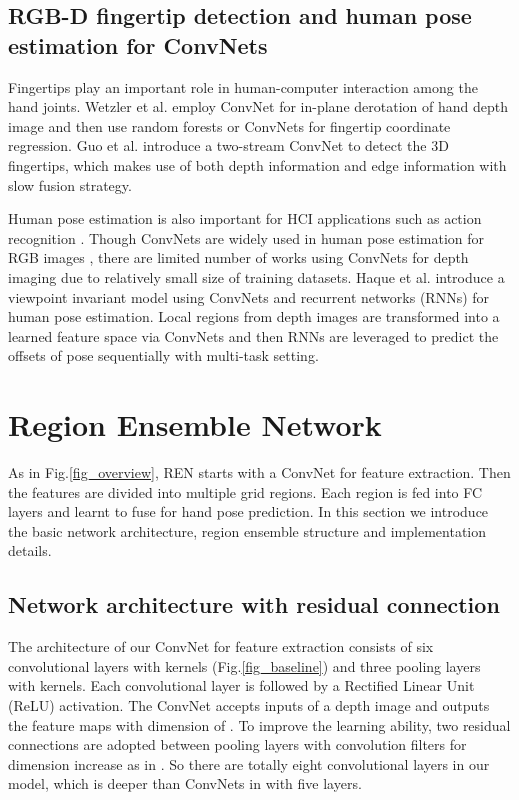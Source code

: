 \documentclass[10pt,twocolumn,letterpaper]{article}
\begin{document}
\subsection{RGB-D fingertip detection and human pose estimation for ConvNets}
Fingertips play an important role in human-computer interaction among the hand joints. Wetzler et al. \cite{wetzler2015rule} employ ConvNet for in-plane derotation of hand depth image and then use random forests or ConvNets for fingertip coordinate regression. Guo et al. \cite{guo2016two} introduce a two-stream ConvNet to detect the 3D fingertips, which makes use of both depth information and edge information with slow fusion strategy.

Human pose estimation is also important for HCI applications such as action recognition \cite{zhang2016rgb} \cite{chen2016novel}. Though ConvNets are widely used in human pose estimation for RGB images \cite{carreira2016human} \cite{bulat2016human}, there are limited number of works using ConvNets for depth imaging \cite{shi2015high} \cite{wang2013depth} due to relatively small size of training datasets. Haque et al. \cite{haque2016towards} introduce a viewpoint invariant model using ConvNets and recurrent networks (RNNs) for human pose estimation. Local regions from depth images are transformed into a learned feature space via ConvNets and then RNNs are leveraged to predict the offsets of pose sequentially with multi-task setting.

\section{Region Ensemble Network}
As in Fig.\ref{fig_overview}, REN starts with a ConvNet for feature extraction. Then the features are divided into multiple grid regions. Each region is fed into FC layers and learnt to fuse for hand pose prediction. In this section we introduce the basic network architecture, region ensemble structure and implementation details.

\subsection{Network architecture with residual connection}
\label{residual}
The architecture of our ConvNet for feature extraction consists of six convolutional layers with  kernels (Fig.\ref{fig_baseline}) and three pooling layers with  kernels. Each convolutional layer is followed by a Rectified Linear Unit (ReLU) activation. The ConvNet accepts inputs of a  depth image and outputs the feature maps with dimension of . To improve the learning ability, two residual connections are adopted between pooling layers with  convolution filters for dimension increase as in \cite{he2015deep}. So there are totally eight convolutional layers in our model, which is deeper than ConvNets in \cite{zhang2016learning} with five layers.
\end{document}

